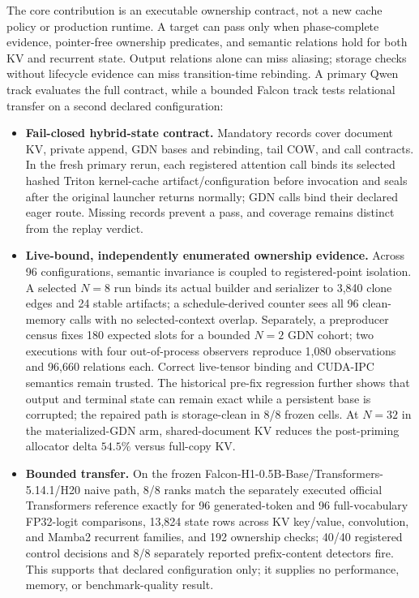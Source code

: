 \documentclass{article}
\begin{document}
The core contribution is an executable ownership contract, not a new cache
policy or production runtime.  A target can pass only when phase-complete
evidence, pointer-free ownership predicates, and semantic relations hold for
both KV and recurrent state.  Output relations alone can miss aliasing; storage
checks without lifecycle evidence can miss transition-time rebinding.  A
primary Qwen track evaluates the full contract, while a bounded Falcon track
tests relational transfer on a second declared configuration:
\begin{itemize}
  \setlength{\itemsep}{1pt}
  \setlength{\parskip}{0pt}
  \item \textbf{Fail-closed hybrid-state contract.} Mandatory records cover
  document KV, private append, GDN bases and rebinding, tail COW, and call
  contracts.  In the fresh primary rerun, each registered attention call binds
  its selected hashed Triton kernel-cache artifact/configuration before
  invocation and seals after the original launcher returns normally; GDN calls
  bind their declared eager route.  Missing records
  prevent a pass, and coverage remains distinct from the replay verdict.
  \item \textbf{Live-bound, independently enumerated ownership evidence.}
  Across 96 configurations, semantic invariance is coupled to registered-point
  isolation.  A selected $N=8$ run binds its actual builder and serializer to
  3,840 clone edges and 24 stable artifacts; a schedule-derived counter sees all 96
  clean-memory calls with no selected-context overlap.  Separately, a
  preproducer census fixes 180 expected slots for a
  bounded $N=2$ GDN cohort; two executions with four out-of-process observers
  reproduce 1,080 observations and 96,660 relations each.  Correct live-tensor
  binding and CUDA-IPC semantics remain trusted.
  The historical pre-fix regression further shows that output and terminal
  state can remain exact while a persistent base is corrupted; the repaired
  path is storage-clean in 8/8 frozen cells.  At $N=32$ in the
  materialized-GDN arm, shared-document KV reduces the post-priming allocator
  delta $54.5\%$ versus full-copy KV.
  \item \textbf{Bounded transfer.} On the frozen
  Falcon-H1-0.5B-Base/Transformers-5.14.1/H20 naive path, 8/8 ranks match the
  separately executed official Transformers reference
  exactly for 96 generated-token and 96 full-vocabulary FP32-logit comparisons,
  13,824 state rows across KV key/value, convolution, and Mamba2 recurrent
  families, and 192
  ownership checks; 40/40 registered control decisions and 8/8 separately
  reported prefix-content detectors fire.  This supports that declared
  configuration only; it supplies no performance, memory, or benchmark-quality
  result.
\end{itemize}
\end{document}
